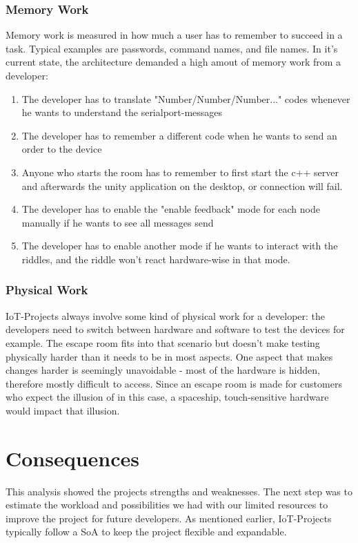 \subsubsection{Memory Work}
Memory work is measured in how much a user has to remember to succeed in a task. 
Typical examples are passwords, command names, and file names.
In it's current state, the architecture demanded a high amout of memory work from a developer:
\begin{enumerate}
    \item The developer has to translate "Number/Number/Number..." codes whenever he wants to understand the serialport-messages 
    \item The developer has to remember a different code when he wants to send an order to the device
    \item Anyone who starts the room has to remember to first start the c++ server and afterwards the unity application on the desktop, or connection will fail.
    \item The developer has to enable the "enable feedback" mode for each node manually if he wants to see all messages send
    \item The developer has to enable another mode if he wants to interact with the riddles, and the riddle won't react hardware-wise in that mode.
\end{enumerate} 

\subsubsection{Physical Work}
IoT-Projects always involve some kind of physical work for a developer: the developers need to switch between hardware and software to test the devices for example.
The escape room fits into that scenario but doesn't make testing physically harder than it needs to be in most aspects. 
One aspect that makes changes harder is seemingly unavoidable - most of the hardware is hidden, therefore mostly difficult to access. 
Since an escape room is made for customers who expect the illusion of in this case, a spaceship, 
touch-sensitive hardware would impact that illusion.

\section{Consequences}
This analysis showed the projects strengths and weaknesses. 
The next step was to estimate the workload and possibilities 
we had with our limited resources to improve the project for future developers. 
As mentioned earlier, IoT-Projects typically follow a SoA %
to keep the project flexible and expandable. 

